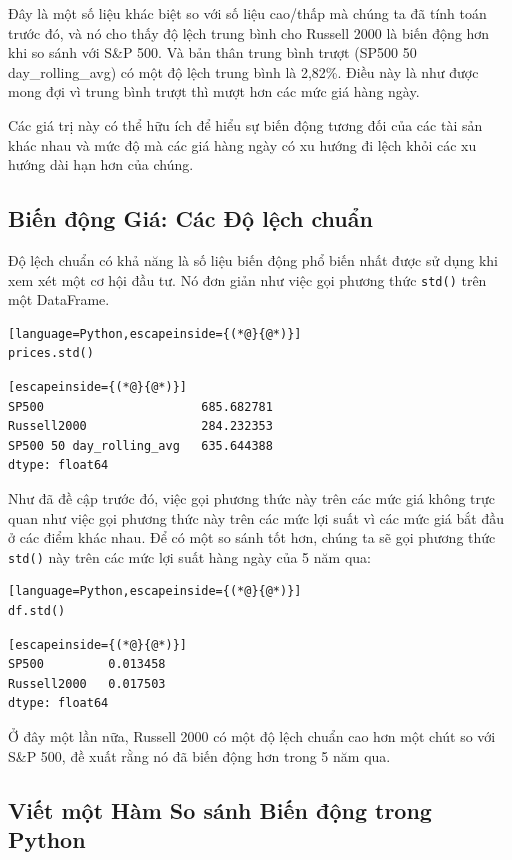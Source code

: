 Đây là một số liệu khác biệt so với số liệu cao/thấp mà chúng ta đã tính toán trước đó, và nó cho thấy độ lệch trung bình cho Russell 2000 là biến động hơn khi so sánh với S\&P 500. Và bản thân trung bình trượt (SP500 50 day\_rolling\_avg) có một độ lệch trung bình là 2,82\%. Điều này là như được mong đợi vì trung bình trượt thì mượt hơn các mức giá hàng ngày.

Các giá trị này có thể hữu ích để hiểu sự biến động tương đối của các tài sản khác nhau và mức độ mà các giá hàng ngày có xu hướng đi lệch khỏi các xu hướng dài hạn hơn của chúng.

\subsection{Biến động Giá: Các Độ lệch chuẩn}

Độ lệch chuẩn có khả năng là số liệu biến động phổ biến nhất được sử dụng khi xem xét một cơ hội đầu tư. Nó đơn giản như việc gọi phương thức \texttt{std()} trên một DataFrame.

\begin{lstlisting}[language=Python,escapeinside={(*@}{@*)}]
prices.std()
\end{lstlisting}

\begin{lstlisting}[escapeinside={(*@}{@*)}]
SP500                      685.682781
Russell2000                284.232353
SP500 50 day_rolling_avg   635.644388
dtype: float64
\end{lstlisting}

Như đã đề cập trước đó, việc gọi phương thức này trên các mức giá không trực quan như việc gọi phương thức này trên các mức lợi suất vì các mức giá bắt đầu ở các điểm khác nhau. Để có một so sánh tốt hơn, chúng ta sẽ gọi phương thức \texttt{std()} này trên các mức lợi suất hàng ngày của 5 năm qua:

\begin{lstlisting}[language=Python,escapeinside={(*@}{@*)}]
df.std()
\end{lstlisting}

\begin{lstlisting}[escapeinside={(*@}{@*)}]
SP500         0.013458
Russell2000   0.017503
dtype: float64
\end{lstlisting}

Ở đây một lần nữa, Russell 2000 có một độ lệch chuẩn cao hơn một chút so với S\&P 500, đề xuất rằng nó đã biến động hơn trong 5 năm qua.

\subsection{Viết một Hàm So sánh Biến động trong Python}

